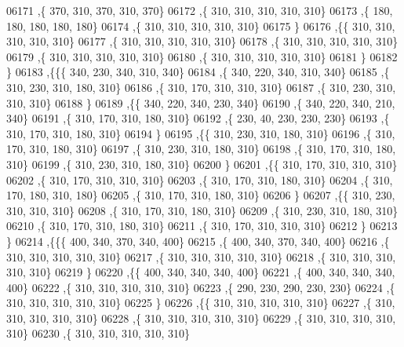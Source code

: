 \begin{DoxyCode}
06171     ,\{   370,   310,   370,   310,   370\}
06172     ,\{   310,   310,   310,   310,   310\}
06173     ,\{   180,   180,   180,   180,   180\}
06174     ,\{   310,   310,   310,   310,   310\}
06175     \}
06176    ,\{\{   310,   310,   310,   310,   310\}
06177     ,\{   310,   310,   310,   310,   310\}
06178     ,\{   310,   310,   310,   310,   310\}
06179     ,\{   310,   310,   310,   310,   310\}
06180     ,\{   310,   310,   310,   310,   310\}
06181     \}
06182    \}
06183   ,\{\{\{   340,   230,   340,   310,   340\}
06184     ,\{   340,   220,   340,   310,   340\}
06185     ,\{   310,   230,   310,   180,   310\}
06186     ,\{   310,   170,   310,   310,   310\}
06187     ,\{   310,   230,   310,   310,   310\}
06188     \}
06189    ,\{\{   340,   220,   340,   230,   340\}
06190     ,\{   340,   220,   340,   210,   340\}
06191     ,\{   310,   170,   310,   180,   310\}
06192     ,\{   230,    40,   230,   230,   230\}
06193     ,\{   310,   170,   310,   180,   310\}
06194     \}
06195    ,\{\{   310,   230,   310,   180,   310\}
06196     ,\{   310,   170,   310,   180,   310\}
06197     ,\{   310,   230,   310,   180,   310\}
06198     ,\{   310,   170,   310,   180,   310\}
06199     ,\{   310,   230,   310,   180,   310\}
06200     \}
06201    ,\{\{   310,   170,   310,   310,   310\}
06202     ,\{   310,   170,   310,   310,   310\}
06203     ,\{   310,   170,   310,   180,   310\}
06204     ,\{   310,   170,   180,   310,   180\}
06205     ,\{   310,   170,   310,   180,   310\}
06206     \}
06207    ,\{\{   310,   230,   310,   310,   310\}
06208     ,\{   310,   170,   310,   180,   310\}
06209     ,\{   310,   230,   310,   180,   310\}
06210     ,\{   310,   170,   310,   180,   310\}
06211     ,\{   310,   170,   310,   310,   310\}
06212     \}
06213    \}
06214   ,\{\{\{   400,   340,   370,   340,   400\}
06215     ,\{   400,   340,   370,   340,   400\}
06216     ,\{   310,   310,   310,   310,   310\}
06217     ,\{   310,   310,   310,   310,   310\}
06218     ,\{   310,   310,   310,   310,   310\}
06219     \}
06220    ,\{\{   400,   340,   340,   340,   400\}
06221     ,\{   400,   340,   340,   340,   400\}
06222     ,\{   310,   310,   310,   310,   310\}
06223     ,\{   290,   230,   290,   230,   230\}
06224     ,\{   310,   310,   310,   310,   310\}
06225     \}
06226    ,\{\{   310,   310,   310,   310,   310\}
06227     ,\{   310,   310,   310,   310,   310\}
06228     ,\{   310,   310,   310,   310,   310\}
06229     ,\{   310,   310,   310,   310,   310\}
06230     ,\{   310,   310,   310,   310,   310\}

\end{DoxyCode}
